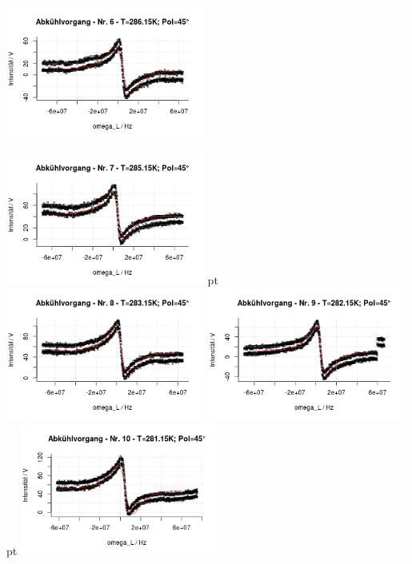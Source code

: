 \documentclass[12pt]{article}
\begin{document}
\begin{minipage}[h!]{\textwidth}
	\includegraphics[width=0.49\textwidth]{figures/cold45-6.png}\vskip -10pt
\end{minipage}
\begin{minipage}[h!]{\textwidth}
	\centering
		
		\includegraphics[width=0.49\textwidth]{figures/cold45-7.png} pt
		\includegraphics[width=0.49\textwidth]{figures/cold45-8.png}\vskip -10pt
		\includegraphics[width=0.49\textwidth]{figures/cold45-9.png} pt
		\includegraphics[width=0.49\textwidth]{figures/cold45-10.png}\vskip -10pt

\end{minipage}
\end{document}
